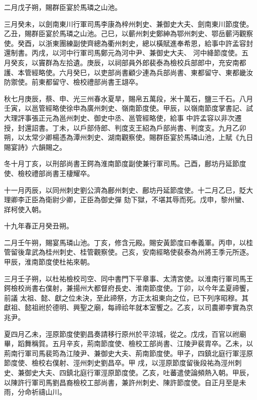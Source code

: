\begin{pinyinscope}
 二月戊子朔，賜群臣宴於馬璘之山池。



 三月癸未，以劍南東川行軍司馬李康為梓州刺史、兼御史大夫、劍南東川節度使。乙丑，賜群臣宴於馬璘之山池。己巳，以蘄州刺史鄭紳為鄂州刺史、鄂岳蘄沔觀察使。癸酉，以浙東團練副使齊總為衢州刺史，總以橫賦進奉希恩，給事中許孟容封還制書。丙戌，以河中行軍司馬鄭元為河中尹、兼御史大夫、
 河中絳節度使。五月癸亥，以竇群為左拾遺。庚辰，以祠部員外郎裴泰為檢校兵部郎中，充安南都護、本管經略使。六月癸巳，以吏部尚書顧少連為兵部尚書、東都留守、東都畿汝防禦使。前東都留守、檢校禮部尚書王翃卒。



 秋七月庚辰，蔡、申、光三州春水夏旱，賜帛五萬段，米十萬石，鹽三千石。八月壬寅，以邕管經略使徐申為廣州刺史、嶺南節度使。甲辰，以嶺南節度掌書記、試大理評事張正元為邕州刺史、御史中丞、邕管經略使，給事
 中許孟容以非次遷授，封還詔書。丁未，以戶部侍郎、判度支王紹為戶部尚書、判度支。九月乙卯朔，以太常少卿楊憑為潭州刺史、湖南觀察使。賜群臣宴於馬璘山池，上賦《九日賜宴詩》六韻賜之。



 冬十月丁亥，以刑部尚書王鍔為淮南節度副使兼行軍司馬。己酉，鄜坊丹延節度使、檢校禮部尚書王棲耀卒。



 十一月丙辰，以同州刺史劉公濟為鄜州刺史、鄜坊丹延節度使。十二月乙巳，貶大理卿李正臣為衛尉少卿，正臣為御史彈
 劾下獄，不堪其辱而死。戊申，黎州蠻、牂柯使入朝。



 十九年春正月癸丑朔。



 二月壬午朔，賜宴馬璘山池。丁亥，修含元殿。賜安黃節度曰奉義軍。丙申，以桂管留後韋武為桂州刺史、桂管觀察使。己亥，安南經略使裴泰為州將王季元所逐。甲辰，淮南節度使杜祐來朝。



 三月壬子朔，以杜祐檢校司空、同中書門下平章事、太清宮使。以淮南行軍司馬王鍔檢校尚書右僕射，兼揚州大都督府長史、淮南節度使。丁卯，以今年孟夏禘饗，前議
 太祖、懿、獻之位未決，至此禘祭，方正太祖東向之位，已下列序昭穆。其獻祖、懿祖祔於德明、興聖之廟，每禘祫年就本室饗之。乙亥，以司農卿李實為京兆尹。



 夏四月乙未，涇原節度使劉昌奏請移行原州於平涼城，從之。戊戌，百官以祔廟畢，蹈舞稱賀。五月辛亥，荊南節度使、檢校工部尚書、江陵尹裴胄卒。乙未，以荊南行軍司馬裴筠為江陵尹、兼御史大夫、荊南節度使。甲子，四鎮北庭行軍涇原節度使、檢校右僕射、涇州刺史劉昌卒。甲
 戌，以涇原節度留後段祐為涇州刺史、兼御史大夫、四鎮北庭行軍涇原節度使。乙亥，吐蕃遣使論頻熱入朝。甲辰，以陳許行軍司馬劉昌裔檢校工部尚書，兼許州刺史、陳許節度使。自正月至是未雨，分命祈禱山川。




\end{pinyinscope}
